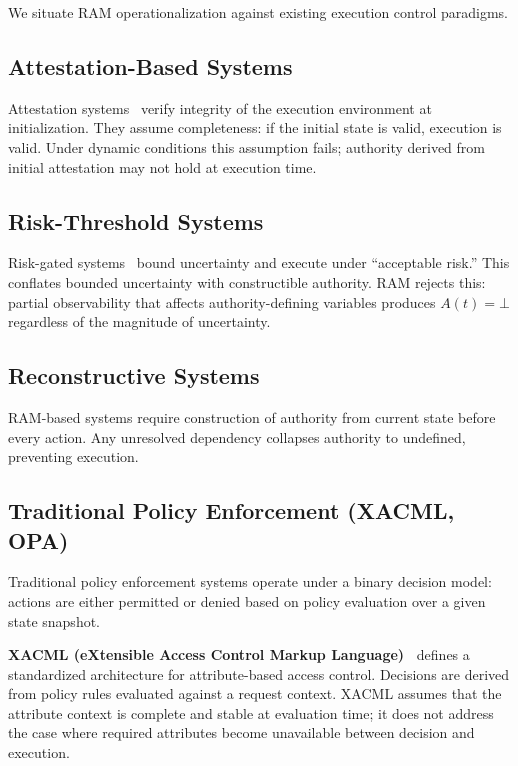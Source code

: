 \documentclass[11pt]{article}
\begin{document}
We situate RAM operationalization against existing execution control paradigms.

\subsection{Attestation-Based Systems}

Attestation systems~\cite{costan2016intel,sabt2015trusted} verify integrity of the
execution environment at initialization. They assume completeness: if the initial state
is valid, execution is valid. Under dynamic conditions this assumption fails; authority
derived from initial attestation may not hold at execution time.

\subsection{Risk-Threshold Systems}

Risk-gated systems~\cite{greenblatt2024ai,leike2018ai} bound uncertainty and execute
under ``acceptable risk.'' This conflates bounded uncertainty with constructible authority.
RAM rejects this: partial observability that affects authority-defining variables produces
$A(t) = \bot$ regardless of the magnitude of uncertainty.

\subsection{Reconstructive Systems}

RAM-based systems require construction of authority from current state before every
action. Any unresolved dependency collapses authority to undefined, preventing execution.

\subsection{Traditional Policy Enforcement (XACML, OPA)}

Traditional policy enforcement systems operate under a binary decision model: actions
are either permitted or denied based on policy evaluation over a given state snapshot.

\textbf{XACML (eXtensible Access Control Markup Language)~\cite{oasis2013xacml}}
defines a standardized architecture for attribute-based access control. Decisions are
derived from policy rules evaluated against a request context. XACML assumes that the
attribute context is complete and stable at evaluation time; it does not address the
case where required attributes become unavailable between decision and execution.
\end{document}
